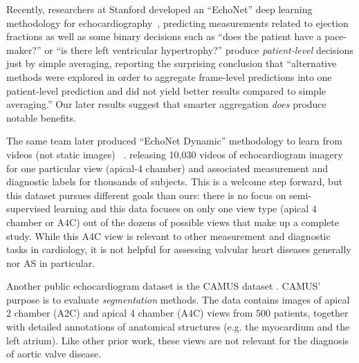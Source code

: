 Recently, researchers at Stanford developed an ``EchoNet'' deep learning methodology for echocardiography~\citep{ghorbaniDeepLearningInterpretation2020}, predicting measurements related to ejection fractions as well as some binary decisions such as ``does the patient have a pace-maker?'' or ``is there left ventricular hypertrophy?''
\citet{ghorbaniDeepLearningInterpretation2020} produce \emph{patient-level} decisions just by simple averaging, reporting the surprising conclusion that ``alternative methods were explored in order to aggregate frame-level predictions into one patient-level prediction and did not yield better results compared to simple averaging.''
Our later results suggest that smarter aggregation \emph{does} produce notable benefits.

The same team later produced ``EchoNet Dynamic'' methodology to learn from videos (not static images)~
\citep{ouyangVideobasedAIBeattobeat2020}.
releasing 10,030 videos of echocardiogram imagery for one particular view (apical-4 chamber) and associated measurement and diagnostic labels for thousands of subjects.
This is a welcome step forward, but this dataset pursues different goals than ours: there is no focus on semi-supervised learning and this data focuses on only one view type (apical 4 chamber or A4C) out of the dozens of possible views that make up a complete study.
While this A4C view is relevant to other measurement and diagnostic tasks in cardiology, it is not helpful for assessing valvular heart diseases generally nor AS in particular.

Another public echocardiogram dataset is the CAMUS dataset \citep{leclerc2019deep}. CAMUS' purpose is to evaluate \emph{segmentation} methods. The data contains images of apical 2 chamber (A2C) and apical 4 chamber (A4C) views from 500 patients, together with detailed annotations of anatomical structures (e.g. the myocardium and the left atrium).  Like other prior work, these views are not relevant for the diagnosis of aortic valve disease.

